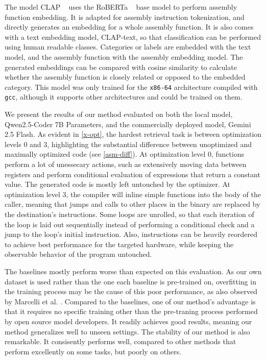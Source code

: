 The model CLAP ~\cite{CLAP} uses the RoBERTa ~\cite{RoBERTa} base model to perform assembly function embedding.
It is adapted for assembly instruction tokenization, and directly generates an embedding for
a whole assembly function. It is also comes with a text embedding model, CLAP-text, so that classification can
be performed using human readable classes. Categories or labels are embedded with the text model, and the
assembly function with the assembly embedding model. The generated embeddings can be compared with cosine similarity to
calculate whether the assembly function is closely related or opposed to the embedded category. This model was only trained
for the \texttt{x86-64} architecture compiled with \texttt{gcc}, although it supports other architectures and could be trained on
them.

We present the results of our method evaluated on both the local model, Qwen2.5-Coder 7B Parameters, and the commercially deployed model,
Gemini 2.5 Flash. As evident in \autoref{x-opt}, the hardest retrieval task is between optimization levels \(0\) and \(3\),
highlighting the substantial difference between unoptimized and maximally optimized code (see \autoref{asm-diff}).
At optimization level \(0\), functions perform a lot of unessecary actions, such as extensively moving
data between registers and perform conditional evaluation of expressions that return a constant value. The generated code
is mostly left untouched by the optimizer. At optimization level \(3\), the compiler will inline simple functions into the
body of the caller, meaning that jumps and calls to other places in the binary are replaced by the destination's instructions.
Some loops are unrolled, so that each iteration of the loop is laid out sequentially instead of performing a conditional check
and a jump to the loop's initial instruction. Also, instructions can be heavily reordered to achieve best performance for the targeted
hardware, while keeping the observable behavior of the program untouched.

The baselines mostly perform worse than expected on this evaluation. As our own dataset is used
rather than the one each baseline is pre-trained on, overfitting in the training process may be the cause of this poor performance,
as also observed by Marcelli et al. \cite{cisco}. Compared to the baselines, one of our method's advantage is that it requires no
specific training other than the pre-traning process performed by open source model developers. It readily achieves good results,
meaning our method generalizes well to unseen settings. The stability of our method is also remarkable. It consisently
performs well, compared to other methods that perform excellently on some tasks, but poorly on others.

